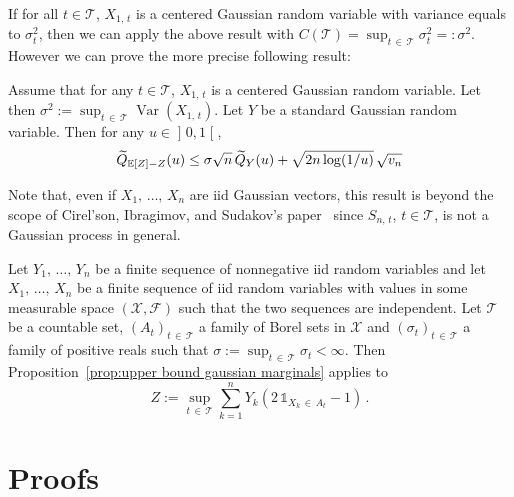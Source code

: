 \documentclass[AHL,Unicode,longabstracts,published]{cedram}
\DeclareMathOperator{\Var}{Var}
\newcommand{\bE}{\mathbb{E}}
\newcommand{\cF}{\mathcal{F}}
\newcommand{\cT}{\mathcal{T}}
\newcommand{\cX}{\mathcal{X}}
\newcommand{\intervalleoo}[2]{\mathopen{]} #1\mathclose{}\mathpunct{},#2\mathclose{[}}
\newcommand{\ind}{\mathds{1}}
\let\oldtilde\tilde
\renewcommand*{\tilde}[1]{\mathchoice{\widetilde{#1}}{\widetilde{#1}}{\oldtilde{#1}}{\oldtilde{#1}}}
\begin{document}
If for all $t\in\cT$, $X_{1,\,t}$ is a centered Gaussian random variable with variance equals to $\sigma_t^2$, then we can apply the above result with $C(\cT)=\sup_{t\,\in\,\cT}\sigma^2_t=:\sigma^2$. However we can prove the more precise following result:

\begin{prop}\label{prop:upper bound gaussian marginals}
Assume that for any $t\in\cT$, $X_{1,\,t}$ is a centered Gaussian random variable. Let then $\sigma^2:=\sup_{t\,\in\,\cT} \Var(X_{1,\,t})$. Let $Y$ be a standard Gaussian random variable. Then for any $u\in\intervalleoo 01$,
\[
\tilde Q_{\bE[Z]-Z}(u)\leq \sigma\sqrt n\,\tilde Q_Y(u)+\sqrt{2n\log(1/u)}\,\sqrt{v_n}
\]
\end{prop}

Note that, even if $X_1,\,\ldots,\,X_n$ are iid Gaussian vectors, this result is beyond the scope of Cirel'son, Ibragimov, and Sudakov's paper~\cite{CIS76} since $S_{n,\,t}$, $t\in\cT$, is not a Gaussian process in general.

\begin{exam}
Let $Y_1,\,\ldots,\, Y_n$ be a finite sequence of nonnegative iid random variables and let $X_1,\,\ldots,\, X_n$ be a finite sequence of iid random variables with values in some measurable space $(\cX,\cF)$ such that the two sequences are independent. Let $\cT$ be a countable set, $(A_t)_{t\,\in\,\cT}$ a family of Borel sets in $\cX$ and $(\sigma_t)_{t\,\in\,\cT}$ a family of positive reals such that $\sigma:=\sup_{t\,\in\,\cT}\sigma_t<\infty$. Then Proposition~\ref{prop:upper bound gaussian marginals} applies to
\[
Z:=\sup_{t\,\in\,\cT}\sum_{k=1}^n Y_k\left(2\,\ind_{X_k\,\in \,A_t}-1\right)\,.
\]
\end{exam}


\section{Proofs}\label{section:proofs}
\end{document}
